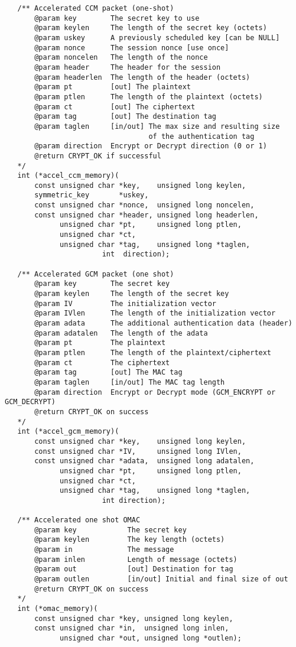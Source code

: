 \documentclass[synpaper]{book}
\begin{document}
\begin{small}
\begin{verbatim}
   /** Accelerated CCM packet (one-shot)
       @param key        The secret key to use
       @param keylen     The length of the secret key (octets)
       @param uskey      A previously scheduled key [can be NULL]
       @param nonce      The session nonce [use once]
       @param noncelen   The length of the nonce
       @param header     The header for the session
       @param headerlen  The length of the header (octets)
       @param pt         [out] The plaintext
       @param ptlen      The length of the plaintext (octets)
       @param ct         [out] The ciphertext
       @param tag        [out] The destination tag
       @param taglen     [in/out] The max size and resulting size
                                  of the authentication tag
       @param direction  Encrypt or Decrypt direction (0 or 1)
       @return CRYPT_OK if successful
   */
   int (*accel_ccm_memory)(
       const unsigned char *key,    unsigned long keylen,
       symmetric_key       *uskey,
       const unsigned char *nonce,  unsigned long noncelen,
       const unsigned char *header, unsigned long headerlen,
             unsigned char *pt,     unsigned long ptlen,
             unsigned char *ct,
             unsigned char *tag,    unsigned long *taglen,
                       int  direction);

   /** Accelerated GCM packet (one shot)
       @param key        The secret key
       @param keylen     The length of the secret key
       @param IV         The initialization vector
       @param IVlen      The length of the initialization vector
       @param adata      The additional authentication data (header)
       @param adatalen   The length of the adata
       @param pt         The plaintext
       @param ptlen      The length of the plaintext/ciphertext
       @param ct         The ciphertext
       @param tag        [out] The MAC tag
       @param taglen     [in/out] The MAC tag length
       @param direction  Encrypt or Decrypt mode (GCM_ENCRYPT or GCM_DECRYPT)
       @return CRYPT_OK on success
   */
   int (*accel_gcm_memory)(
       const unsigned char *key,    unsigned long keylen,
       const unsigned char *IV,     unsigned long IVlen,
       const unsigned char *adata,  unsigned long adatalen,
             unsigned char *pt,     unsigned long ptlen,
             unsigned char *ct,
             unsigned char *tag,    unsigned long *taglen,
                       int direction);

   /** Accelerated one shot OMAC
       @param key            The secret key
       @param keylen         The key length (octets)
       @param in             The message
       @param inlen          Length of message (octets)
       @param out            [out] Destination for tag
       @param outlen         [in/out] Initial and final size of out
       @return CRYPT_OK on success
   */
   int (*omac_memory)(
       const unsigned char *key, unsigned long keylen,
       const unsigned char *in,  unsigned long inlen,
             unsigned char *out, unsigned long *outlen);


\end{verbatim}
\end{small}
\end{document}
